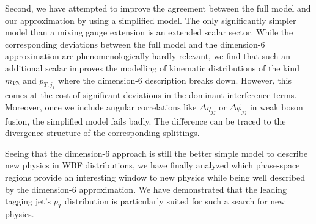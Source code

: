 Second, we have attempted to improve the agreement between the full
model and our approximation by using a simplified model. The only
significantly simpler model than a mixing gauge extension is an
extended scalar sector. While the corresponding deviations between the
full model and the dimension-6 approximation are phenomenologically
hardly relevant, we find that such an additional scalar improves the
modelling of kinematic distributions of the kind $m_{Vh}$ and
$p_{T,j_1}$ where the dimension-6 description breaks down. However,
this comes at the cost of significant deviations in the dominant
interference terms. Moreover, once we include angular correlations
like $\Delta \eta_{jj}$ or $\Delta \phi_{jj}$ in weak boson fusion,
the simplified model fails badly. The difference can be traced to the
divergence structure of the corresponding splittings.

Seeing that the dimension-6 approach is still the better simple model
to describe new physics in WBF distributions, we have finally analyzed
which phase-space regions provide an interesting window to new physics
while being well described by the dimension-6 approximation.  We have
demonstrated that the leading tagging jet's $p_T$ distribution is
particularly suited for such a search for new physics.
